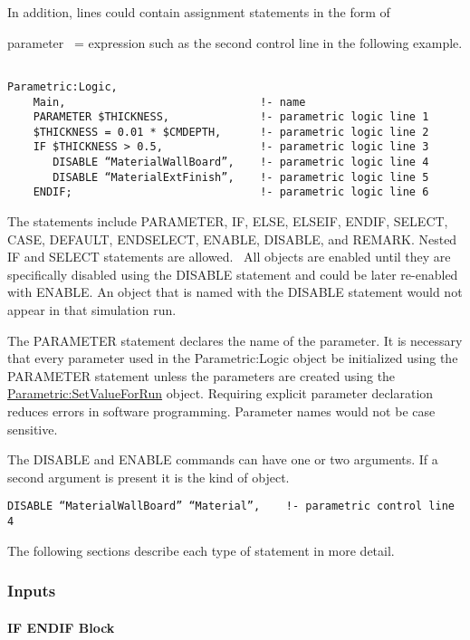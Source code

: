 In addition, lines could contain assignment statements in the form of

parameter~ = expression such as the second control line in the following example.

\begin{lstlisting}

Parametric:Logic,
    Main,                              !- name
    PARAMETER $THICKNESS,              !- parametric logic line 1
    $THICKNESS = 0.01 * $CMDEPTH,      !- parametric logic line 2
    IF $THICKNESS > 0.5,               !- parametric logic line 3
       DISABLE “MaterialWallBoard”,    !- parametric logic line 4
       DISABLE “MaterialExtFinish”,    !- parametric logic line 5
    ENDIF;                             !- parametric logic line 6
\end{lstlisting}

The statements include PARAMETER, IF, ELSE, ELSEIF, ENDIF, SELECT, CASE, DEFAULT, ENDSELECT, ENABLE, DISABLE, and REMARK. Nested IF and SELECT statements are allowed.~ All objects are enabled until they are specifically disabled using the DISABLE statement and could be later re-enabled with ENABLE. An object that is named with the DISABLE statement would not appear in that simulation run.

The PARAMETER statement declares the name of the parameter. It is necessary that every parameter used in the Parametric:Logic object be initialized using the PARAMETER statement unless the parameters are created using the \hyperref[parametricsetvalueforrun]{Parametric:SetValueForRun} object. Requiring explicit parameter declaration reduces errors in software programming. Parameter names would not be case sensitive.

The DISABLE and ENABLE commands can have one or two arguments. If a second argument is present it is the kind of object.

\begin{lstlisting}
DISABLE “MaterialWallBoard” “Material”,    !- parametric control line 4
\end{lstlisting}

The following sections describe each type of statement in more detail.

\subsubsection{Inputs}\label{inputs-1-027}

\paragraph{IF ENDIF Block}\label{if-endif-block}

